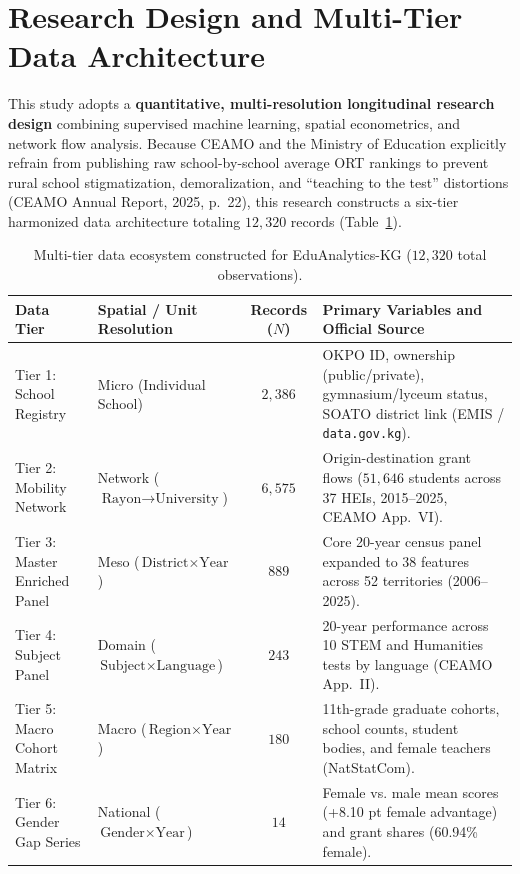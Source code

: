 \documentclass[12pt,letterpaper]{report}
\begin{document}
\section{Research Design and Multi-Tier Data Architecture}
This study adopts a \textbf{quantitative, multi-resolution longitudinal research design} combining supervised machine learning, spatial econometrics, and network flow analysis. Because CEAMO and the Ministry of Education explicitly refrain from publishing raw school-by-school average ORT rankings to prevent rural school stigmatization, demoralization, and ``teaching to the test'' distortions (CEAMO Annual Report, 2025, p.~22), this research constructs a six-tier harmonized data architecture totaling $12,320$ records (Table~\ref{tab:data_ecosystem}).

\begin{table}[htbp]
\centering
\begin{singlespace}
\small
\caption{Multi-tier data ecosystem constructed for EduAnalytics-KG ($12,320$ total observations).}
\label{tab:data_ecosystem}
\begin{tabularx}{\textwidth}{l l c X}
\toprule
\textbf{Data Tier} & \textbf{Spatial / Unit Resolution} & \textbf{Records ($N$)} & \textbf{Primary Variables and Official Source} \\
\midrule
Tier 1: School Registry & Micro (Individual School) & $2,386$ & OKPO ID, ownership (public/private), gymnasium/lyceum status, SOATO district link (EMIS / \texttt{data.gov.kg}). \\
Tier 2: Mobility Network & Network ($\text{Rayon} \to \text{University}$) & $6,575$ & Origin-destination grant flows ($51,646$ students across 37 HEIs, 2015--2025, CEAMO App.~VI). \\
Tier 3: Master Enriched Panel & Meso ($\text{District} \times \text{Year}$) & $889$ & Core 20-year census panel expanded to 38 features across 52 territories (2006--2025). \\
Tier 4: Subject Panel & Domain ($\text{Subject} \times \text{Language}$) & $243$ & 20-year performance across 10 STEM and Humanities tests by language (CEAMO App.~II). \\
Tier 5: Macro Cohort Matrix & Macro ($\text{Region} \times \text{Year}$) & $180$ & 11th-grade graduate cohorts, school counts, student bodies, and female teachers (NatStatCom). \\
Tier 6: Gender Gap Series & National ($\text{Gender} \times \text{Year}$) & $14$ & Female vs. male mean scores (+8.10 pt female advantage) and grant shares (60.94\% female). \\
\bottomrule
\end{tabularx}
\end{singlespace}
\end{table}
\end{document}
